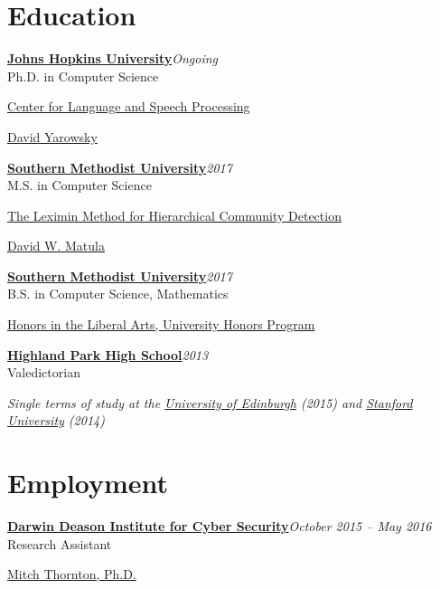 \documentclass[margin, 10pt]{res} %
\newcommand{\Year}[1]{\emph{#1}}
\newcommand{\uni}[1]{\textbf{#1}}
\newcommand{\eventYear}[2]{\uni{#1}\hfill{\Year{#2}}\\}
\newcommand{\JHU}{\href{https://www.jhu.edu/}{Johns Hopkins University}}
\newcommand{\SMU}{\href{https://www.smu.edu/}{Southern Methodist University}}
\newcommand{\HPHS}{\href{http://hs.hpisd.org}{Highland Park High School}}
\newcommand{\STAN}{\href{https://www.stanford.edu/}{Stanford University}}
\newcommand{\UOE}{\href{https://www.ed.ac.uk/}{University of Edinburgh}}
\newcommand{\CLSP}{\href{https://www.clsp.jhu.edu}{Center for Language and Speech Processing}}
\begin{document}
\begin{resume}
\section{Education}

\eventYear{\JHU}{Ongoing}
	Ph.D. in Computer Science
	\begin{description}[noitemsep, labelindent=1em]
	\item[Affiliation:] \CLSP
	\item[Advisor:] \href{http://www.cs.jhu.edu/~yarowsky/}{David Yarowsky}
	\end{description}

\eventYear{\SMU}{2017}
	M.S. in Computer Science
	\begin{description}[noitemsep, labelindent=1em]
	\item[Thesis:] \href{https://search.proquest.com/docview/1907180434?pq-origsite=gscholar}{The Leximin Method for Hierarchical Community Detection}
	\item[Advisor:] \href{https://lyle.smu.edu/~matula/}{David W. Matula}
	\end{description}
 
\eventYear{\SMU}{2017}
	B.S. in Computer Science, Mathematics
	\begin{description}[noitemsep, labelindent=0.5em]
	\item \href{http://www.smu.edu/dedman/studentresources/universityhonors}{Honors in the Liberal Arts, University Honors Program}
	\end{description}
	
\eventYear{\HPHS}{2013}
	Valedictorian
	
\emph{Single terms of study at the \UOE{} (2015) and \STAN{} (2014)}



\section{Employment}

\begin{samepage}
\eventYear{\href{https://www.smu.edu/Lyle/Institutes/DeasonInstitute}{Darwin Deason Institute for Cyber Security}}{October 2015 -- May 2016}
Research Assistant
\begin{description}[nosep]
\item[Host:] \href{https://s2.smu.edu/~mitch/}{Mitch Thornton, Ph.D.}
\end{description}
\end{samepage}


\end{resume}
\end{document}

